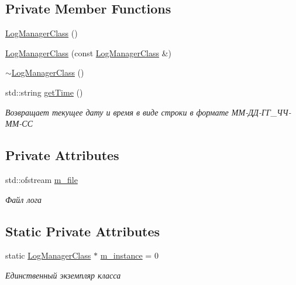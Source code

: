\subsection*{Private Member Functions}
\begin{DoxyCompactItemize}
\item 
\hyperlink{class_log_manager_class_a81fed6f425bf3b772befde0581d1bebd}{Log\+Manager\+Class} ()
\item 
\hyperlink{class_log_manager_class_a804c1c0777b52b07fd0d5976dd40af00}{Log\+Manager\+Class} (const \hyperlink{class_log_manager_class}{Log\+Manager\+Class} \&)
\item 
\hyperlink{class_log_manager_class_a75daac8c643dae796ca0205a5ce6d4e2}{$\sim$\+Log\+Manager\+Class} ()
\item 
std\+::string \hyperlink{class_log_manager_class_ad3626b174d18e15b33c1ebfc0eea6788}{get\+Time} ()
\begin{DoxyCompactList}\small\item\em Возвращает текущее дату и время в виде строки в формате ММ-\/ДД-\/ГГ\+\_\+ЧЧ-\/ММ-\/СС \end{DoxyCompactList}\end{DoxyCompactItemize}
\subsection*{Private Attributes}
\begin{DoxyCompactItemize}
\item 
std\+::ofstream \hyperlink{class_log_manager_class_ab2d1af381633456d999dc9ad2801c9f7}{m\+\_\+file}
\begin{DoxyCompactList}\small\item\em Файл лога \end{DoxyCompactList}\end{DoxyCompactItemize}
\subsection*{Static Private Attributes}
\begin{DoxyCompactItemize}
\item 
static \hyperlink{class_log_manager_class}{Log\+Manager\+Class} $\ast$ \hyperlink{class_log_manager_class_a00d2649a15e89917cf53ced070fb40db}{m\+\_\+instance} = 0
\begin{DoxyCompactList}\small\item\em Единственный экземпляр класса \end{DoxyCompactList}\end{DoxyCompactItemize}


